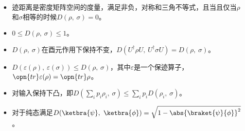 \begin{itemize}
\item 迹距离是密度矩阵空间的度量，满足非负，对称和三角不等式，且当且仅当$\rho$和$\sigma$相等的时候$D\left(\rho,~\sigma\right) = 0$。
\item $0 \leqslant D\left(\rho,~\sigma\right) \leqslant 1$。
\item $D\left(\rho,~\sigma\right)$在酉元作用下保持不变，$D\left(U^\dagger\rho U,~U^\dagger\sigma U\right) = D\left(\rho,~\sigma\right)$。
\item $D\left(\varepsilon(\rho),~\varepsilon(\sigma)\right) \leqslant D\left(\rho,~\sigma\right)$，其中$\varepsilon$是一个保迹算子，$\opn{tr}\varepsilon(\rho) = \opn{tr}\rho$。
\item 对输入保持下凸，即$D\left(\sum_i p_i\rho_i,~\sigma\right) \leqslant \sum_i p_iD\left(\rho_i,~\sigma\right)$。
\item 对于纯态满足$D(\ketbra{\psi},~\ketbra{\phi}) = \sqrt{1 - \abs{\braket{\psi}{\phi}}^2}$。
\end{itemize}
